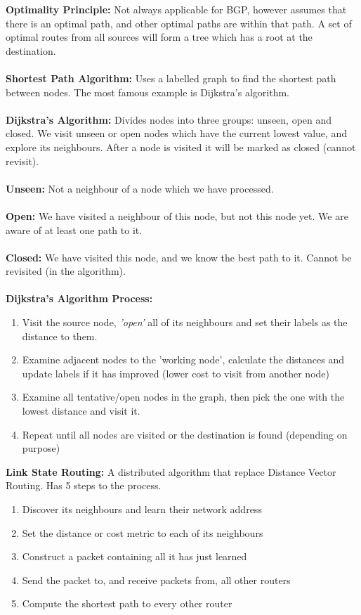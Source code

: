 \documentclass[a4paper,10pt]{article}
\begin{document}
\textcolor{Melon}{\textbf{Optimality Principle:}} Not always applicable for BGP, however assumes that there is an optimal path, and other optimal paths are within that path. A set of optimal routes from all sources will form a tree which has a root at the destination. \\\\
\textcolor{Melon}{\textbf{Shortest Path Algorithm:}} Uses a labelled graph to find the shortest path between nodes. The most famous example is Dijkstra's algorithm.\\\\ 
\textcolor{Melon}{\textbf{Dijkstra's Algorithm:}} Divides nodes into three groups: unseen, open and closed. We visit unseen or open nodes which have the current lowest value, and explore its neighbours. After a node is visited it will be marked as closed (cannot revisit). \\\\
\textcolor{Melon}{\textbf{Unseen:}} Not a neighbour of a node which we have processed. \\\\
\textcolor{Melon}{\textbf{Open:}} We have visited a neighbour of this node, but not this node yet. We are aware of at least one path to it. \\\\
\textcolor{Melon}{\textbf{Closed:}} We have visited this node, and we know the best path to it. Cannot be revisited (in the algorithm). \\\\ 
\textcolor{Melon}{\textbf{Dijkstra's Algorithm Process:}}
\begin{enumerate}
	\item Visit the source node, \emph{'open'} all of its neighbours and set their labels as the distance to them. 
	\item Examine adjacent nodes to the 'working node', calculate the distances and update labels if it has improved (lower cost to visit from another node)
	\item Examine all tentative/open nodes in the graph, then pick the one with the lowest distance and visit it. 
	\item Repeat until all nodes are visited or the destination is found (depending on purpose) 
\end{enumerate}
\textcolor{Melon}{\textbf{Link State Routing:}} A distributed algorithm that replace Distance Vector Routing. Has 5 steps to the process. 
\begin{enumerate}
	\item Discover its neighbours and learn their network address 
	\item Set the distance or cost metric to each of its neighbours 
	\item Construct a packet containing all it has just learned 
	\item Send the packet to, and receive packets from, all other routers
	\item Compute the shortest path to every other router 
\end{enumerate}
\end{document}
